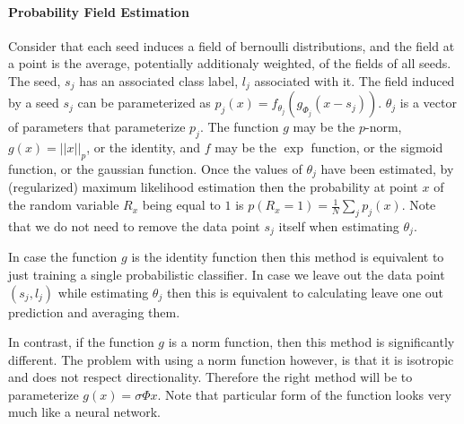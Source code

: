 \documentclass[14pt]{article}
\begin{document}
\paragraph{Probability Field Estimation}
Consider that each seed induces a field of bernoulli distributions, and the
field at a point is the average, potentially additionaly weighted,
of the fields of all seeds. The seed, $s_j$ has an associated class label, $l_j$ associated
with it. The field induced by a seed $s_j$ can be
parameterized as $p_j(x) = f_{\theta_j}(g_{\Phi_j}(x - s_j))$. $\theta_j$ is a vector of
parameters that parameterize $p_j$. The function $g$ may be the
$p$-norm, $g(x) = ||x||_p$, or the identity, and $f$ may be the $\exp$
function, or the sigmoid function, or the gaussian function. Once the values
of $\theta_j$ have been estimated, by (regularized) maximum likelihood estimation
then the probability at point $x$ of the random variable $R_x$ being equal to $1$ is
$p(R_x = 1) = \frac{1}{N} \sum_{j} p_j(x)$. Note that we do not need to remove the data
point $s_j$ itself when estimating $\theta_j$.

In case the function $g$ is the identity function then this method is equivalent
to just training a single probabilistic classifier. In case we leave out the
data point $(s_j, l_j)$ while estimating $\theta_j$ then this is equivalent
to calculating leave one out prediction and averaging them.

In contrast, if the function $g$ is a norm function, then this method is
significantly different. The problem with using a norm function however,
is that it is isotropic and does not respect directionality. Therefore the
right method will be to parameterize $g(x)=\sigma{\Phi{x}}$. Note that
particular form of the function looks very much like a neural network.
% 
% 
\end{document}
